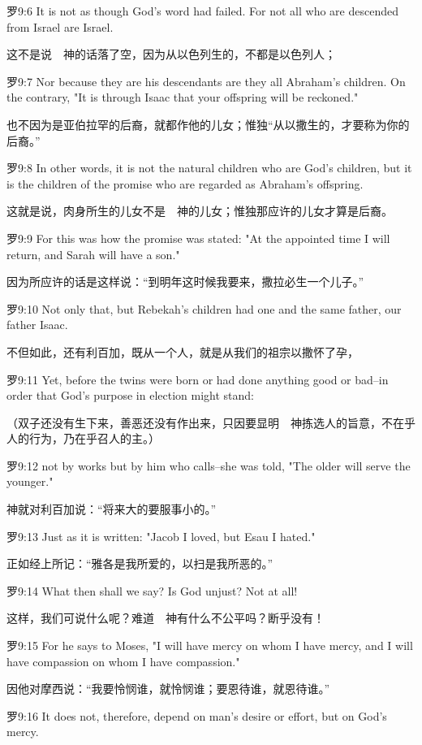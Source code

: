 \documentclass[a4paper,11pt,onecolumn,twoside]{ctexart}
\begin{document}
\begin{multicols}{2}
 罗9:6
 It is not as though God's word had failed. For not all who are descended from Israel are Israel.

 这不是说　神的话落了空，因为从以色列生的，不都是以色列人；


 罗9:7
 Nor because they are his descendants are they all Abraham's children. On the contrary, "It is through Isaac that your offspring will be reckoned."

 也不因为是亚伯拉罕的后裔，就都作他的儿女；惟独“从以撒生的，才要称为你的后裔。”


 罗9:8
 In other words, it is not the natural children who are God's children, but it is the children of the promise who are regarded as Abraham's offspring.

 这就是说，肉身所生的儿女不是　神的儿女；惟独那应许的儿女才算是后裔。


 罗9:9
 For this was how the promise was stated: "At the appointed time I will return, and Sarah will have a son."

 因为所应许的话是这样说：“到明年这时候我要来，撒拉必生一个儿子。”


 罗9:10
 Not only that, but Rebekah's children had one and the same father, our father Isaac.

 不但如此，还有利百加，既从一个人，就是从我们的祖宗以撒怀了孕，


 罗9:11
 Yet, before the twins were born or had done anything good or bad--in order that God's purpose in election might stand:

 （双子还没有生下来，善恶还没有作出来，只因要显明　神拣选人的旨意，不在乎人的行为，乃在乎召人的主。）


 罗9:12
 not by works but by him who calls--she was told, "The older will serve the younger."

 神就对利百加说：“将来大的要服事小的。”


 罗9:13
 Just as it is written: "Jacob I loved, but Esau I hated."

 正如经上所记：“雅各是我所爱的，以扫是我所恶的。”


 罗9:14
 What then shall we say? Is God unjust? Not at all!

 这样，我们可说什么呢？难道　神有什么不公平吗？断乎没有！


 罗9:15
 For he says to Moses, "I will have mercy on whom I have mercy, and I will have compassion on whom I have compassion."

 因他对摩西说：“我要怜悯谁，就怜悯谁；要恩待谁，就恩待谁。”


 罗9:16
 It does not, therefore, depend on man's desire or effort, but on God's mercy.


\end{multicols}
\end{document}
